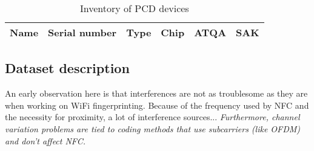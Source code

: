 \begin{table}[h!]
  \centering
  \begin{tabular}{|l|l|l|l|l|l|}
    \hline
    \textbf{Name} & \textbf{Serial number}  & \textbf{Type}        & \textbf{Chip}     & \textbf{ATQA} & \textbf{SAK} \\ \hline
  \end{tabular}
  \caption{Inventory of PCD devices}
  \label{tab:pcd-inventory}
\end{table}

\subsection{Dataset description}

An early observation here is that interferences are not as troublesome as they are when working on WiFi fingerprinting. Because of the frequency used by NFC and the necessity for proximity, a lot of interference sources... \textit{Furthermore, channel variation problems are tied to coding methods that use subcarriers (like OFDM) and don't affect NFC.}
